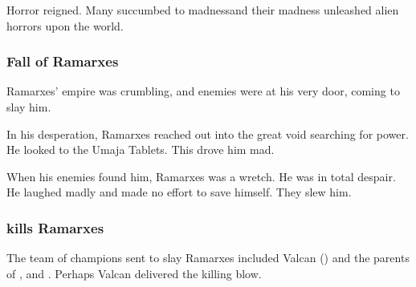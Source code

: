 Horror reigned. 
Many \ophidians succumbed to madness\dash and their madness unleashed alien horrors upon the world. 





\subsubsection{Fall of Ramarxes}
Ramarxes' empire was crumbling, and enemies were at his very door, coming to slay him. 

In his desperation, Ramarxes reached out into the great void searching for power.
He looked to the Umaja Tablets. 
This drove him mad. 

When his enemies found him, Ramarxes was a wretch. 
He was in total despair. 
He laughed madly and made no effort to save himself. 
They slew him. 





\subsubsection{\Sethicus kills Ramarxes}
The team of champions sent to slay Ramarxes included Valcan () and the parents of \Nexagglachel, \Iscrafel and \Secherdamon. 
Perhaps Valcan delivered the killing blow. 










